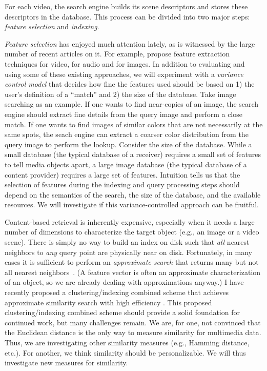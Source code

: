 For each video, the search engine builds its scene descriptors and stores
these descriptors in the database.  This process can be divided into
two major steps: {\em feature selection} and {\em indexing}. 

{\it Feature selection}
has enjoyed much attention lately, as is witnessed by the
large number of recent articles on it.
For example, \cite{Ccmsz97,Hjw95,Mmz95,Mc96,Zks93} propose
feature extraction techniques for video, \cite{Bc94,Pfe96} for audio
and \cite{img11,img12,img13,Pps96,Pzm96,Hkm97} for images.
In addition to evaluating and using some of these
existing approaches, we will experiment with 
a {\em variance control model}
that decides how fine the features used should be 
based on 1) the user's definition of a ``match'' 
and 2) the size of the database.  Take image searching as an example.
If one wants to find near-copies of an image,
the search engine should extract fine details
from the query image and perform a close match.
If one wants to find  
images of similar colors that are not necessarily
at the same spots, the seach engine
can extract a coarser color distribution from the query image
to perform the lookup.  Consider the
size of the database. While a small database 
(the typical database of a receiver) requires a 
small set of features to tell media objects apart, a
large image database (the typical database of a content provider)
requires a large set of features.
Intuition tells us that the selection of features
during the indexing and query processing steps
should depend on the semantics of
the search, the size of the database, and the 
available resources.  We will investigate
if this variance-controlled approach can be fruitful.

Content-based retrieval
is inherently expensive, especially when
it needs a large number of dimensions to characterize the
target object (e.g., an image or a video scene).
There is simply no way to
build an index on disk such that {\em all} nearest neighbors to {\em
any} query point are physically near on disk.
Fortunately, in many cases it is
sufficient to perform an {\em approximate search} that returns many
but not all nearest neighbors~\cite{AM94,Cla94,IM98,Jk97,KOR98}.  (A
feature vector is often an approximate characterization of an object,
so we are already dealing with approximations anyway.)
I have recently proposed a
clustering/indexing combined scheme that achieves approximate
similarity search with high efficiency \cite{Lch99}.
This proposed clustering/indexing combined scheme should
provide a solid foundation for continued work,
but many challenges remain. We are, for one, not
convinced that the Euclidean distance
is the only way to measure similarity for multimedia data.
Thus, we are investigating other similarity measures
(e.g., Hamming distance, etc.). For another,
we think similarity should be personalizable.
We will thus investigate new measures for similarity.

